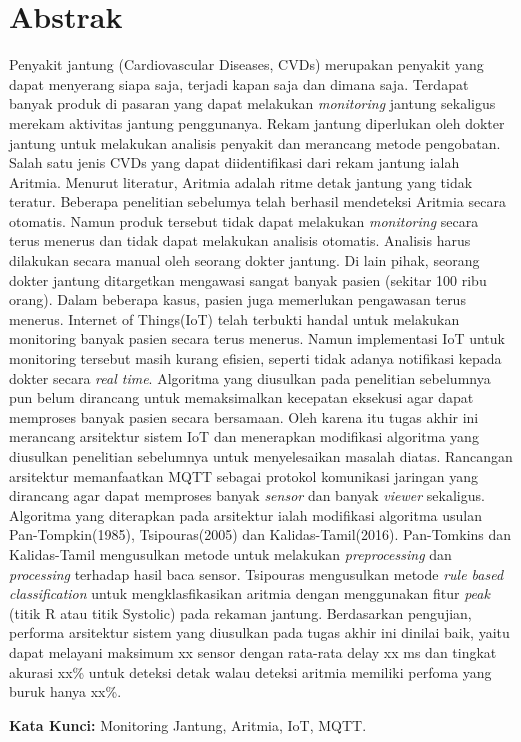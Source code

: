 \chapter*{Abstrak}
Penyakit jantung (Cardiovascular Diseases, CVDs) merupakan penyakit yang dapat menyerang siapa saja, terjadi kapan saja dan dimana saja. Terdapat banyak produk di pasaran yang dapat melakukan \textit{monitoring} jantung sekaligus merekam aktivitas jantung penggunanya. Rekam jantung diperlukan oleh dokter jantung untuk melakukan analisis penyakit dan merancang metode pengobatan. Salah satu jenis CVDs yang dapat diidentifikasi dari rekam jantung ialah Aritmia. Menurut literatur, Aritmia adalah ritme detak jantung yang tidak teratur. Beberapa penelitian sebelumya telah berhasil mendeteksi Aritmia secara otomatis.	
Namun produk tersebut tidak dapat melakukan \textit{monitoring} secara terus menerus dan tidak dapat melakukan analisis otomatis. Analisis harus dilakukan secara manual oleh seorang dokter jantung. Di lain pihak, seorang dokter jantung ditargetkan mengawasi sangat banyak pasien (sekitar 100 ribu orang). Dalam beberapa kasus, pasien juga memerlukan pengawasan terus menerus. Internet of Things(IoT) telah terbukti handal untuk melakukan monitoring banyak pasien secara terus menerus. Namun implementasi IoT untuk monitoring tersebut masih kurang efisien, seperti tidak adanya notifikasi kepada dokter secara \textit{real time}. Algoritma yang diusulkan pada penelitian sebelumnya pun belum dirancang untuk memaksimalkan kecepatan eksekusi agar dapat memproses banyak pasien secara bersamaan.
Oleh karena itu tugas akhir ini merancang arsitektur sistem IoT dan menerapkan modifikasi algoritma yang diusulkan penelitian sebelumnya untuk menyelesaikan masalah diatas.
Rancangan arsitektur memanfaatkan MQTT sebagai protokol komunikasi jaringan yang dirancang agar dapat memproses banyak \textit{sensor} dan banyak \textit{viewer} sekaligus. Algoritma yang diterapkan pada arsitektur ialah modifikasi algoritma usulan Pan-Tompkin(1985), Tsipouras(2005) dan Kalidas-Tamil(2016).
Pan-Tomkins dan Kalidas-Tamil mengusulkan metode untuk melakukan \textit{preprocessing} dan \textit{processing} terhadap hasil baca sensor. Tsipouras mengusulkan metode \textit{rule based classification} untuk mengklasfikasikan aritmia dengan menggunakan fitur \textit{peak} (titik R atau titik Systolic) pada rekaman jantung.
Berdasarkan pengujian, performa arsitektur sistem yang diusulkan pada tugas akhir ini dinilai baik, yaitu dapat melayani maksimum xx sensor dengan rata-rata delay xx ms dan tingkat akurasi xx\% untuk deteksi detak walau deteksi aritmia memiliki perfoma yang buruk hanya xx\%.
  
\vspace{0.5 cm}
\begin{flushleft}
{\textbf{Kata Kunci:} Monitoring Jantung, Aritmia, IoT, MQTT.}
\end{flushleft}